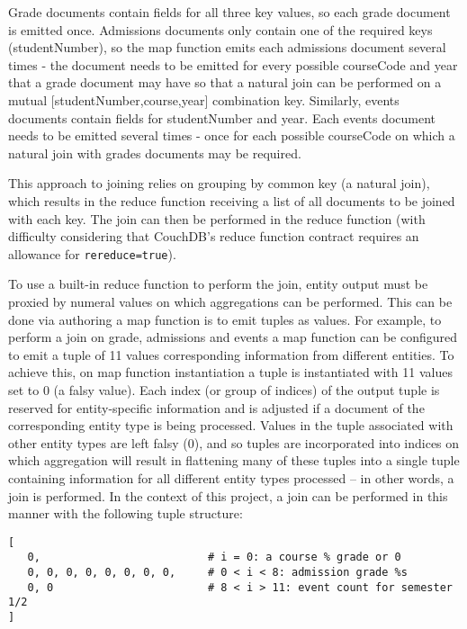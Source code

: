 Grade documents contain fields for all three key values, so each grade document is emitted once. Admissions documents only contain one of the required keys (studentNumber), so the map function emits each admissions document several times - the document needs to be emitted for every possible courseCode and year that a grade document may have so that a natural join can be performed on a mutual [studentNumber,course,year] combination key. Similarly, events documents contain fields for studentNumber and year. Each events document needs to be emitted several times - once for each possible courseCode on which a natural join with grades documents may be required.

This approach to joining relies on grouping by common key (a natural join), which results in the reduce function receiving a list of all documents to be joined with each key. The join can then be performed in the reduce function (with difficulty considering that CouchDB's reduce function contract requires an allowance for \texttt{rereduce=true}).

To use a built-in reduce function to perform the join, entity output must be proxied by numeral values on which aggregations can be performed. This can be done via authoring a map function is to emit tuples as values. For example, to perform a join on grade, admissions and events a map function can be configured to emit a tuple of 11 values corresponding information from different entities. To achieve this, on map function instantiation a tuple is instantiated with 11 values set to 0 (a falsy value). Each index (or group of indices) of the output tuple is reserved for entity-specific information and is adjusted if a document of the corresponding entity type is being processed. Values in the tuple associated with other entity types are left falsy (0), and so tuples are incorporated into indices on which aggregation will result in flattening many of these tuples into a single tuple containing information for all different entity types processed – in other words, a join is performed. In the context of this project, a join can be performed in this manner with the following tuple structure:

\begin{verbatim}
[
   0,                          # i = 0: a course % grade or 0
   0, 0, 0, 0, 0, 0, 0, 0,     # 0 < i < 8: admission grade %s
   0, 0                        # 8 < i > 11: event count for semester 1/2
]
\end{verbatim}

